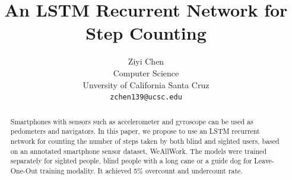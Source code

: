 \documentclass[11pt]{article}
\title{An LSTM Recurrent Network for Step Counting}
\author{Ziyi Chen \\
  Computer Science  \\
  Unversity of California Santa Cruz\\
  {\tt zchen139@ucsc.edu}}
\date{}
\begin{document}
\onecolumn

%  
%




\maketitle
\begin{abstract}

Smartphones with sensors such as accelerometer and gyroscope can be used as pedometers and navigators. In this paper, we propose to use an LSTM recurrent network for counting the number of steps taken by both blind and sighted users, based on an annotated smartphone sensor dataset, WeAllWork. The models were trained separately for sighted people, blind people with a long cane or a guide dog for Leave-One-Out training modality. It achieved 5\% overcount and undercount rate.

\end{abstract}
\end{document}
